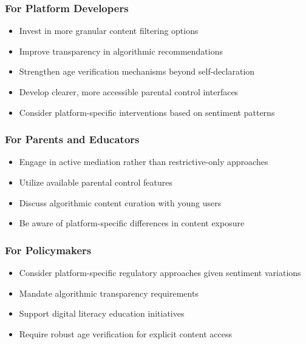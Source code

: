 \documentclass[12pt,a4paper]{article}
\begin{document}
\subsubsection{For Platform Developers}

\begin{itemize}[leftmargin=*, itemsep=0.3em]
    \item Invest in more granular content filtering options
    \item Improve transparency in algorithmic recommendations
    \item Strengthen age verification mechanisms beyond self-declaration
    \item Develop clearer, more accessible parental control interfaces
    \item Consider platform-specific interventions based on sentiment patterns
\end{itemize}

\subsubsection{For Parents and Educators}

\begin{itemize}[leftmargin=*, itemsep=0.3em]
    \item Engage in active mediation rather than restrictive-only approaches \citep{livingstone2017parental}
    \item Utilize available parental control features
    \item Discuss algorithmic content curation with young users
    \item Be aware of platform-specific differences in content exposure
\end{itemize}

\subsubsection{For Policymakers}

\begin{itemize}[leftmargin=*, itemsep=0.3em]
    \item Consider platform-specific regulatory approaches given sentiment variations
    \item Mandate algorithmic transparency requirements
    \item Support digital literacy education initiatives
    \item Require robust age verification for explicit content access
\end{itemize}
\end{document}
